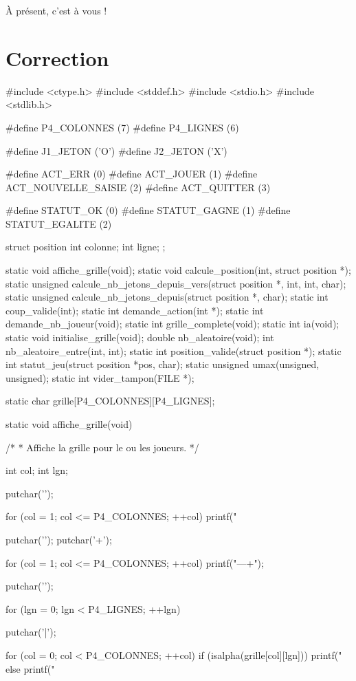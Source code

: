 À présent, c'est à vous !

\section{Correction}
\label{correction-19}

\begin{C}
#include <ctype.h>
#include <stddef.h>
#include <stdio.h>
#include <stdlib.h>

#define P4_COLONNES (7)
#define P4_LIGNES (6)

#define J1_JETON ('O')
#define J2_JETON ('X')

#define ACT_ERR (0)
#define ACT_JOUER (1)
#define ACT_NOUVELLE_SAISIE (2)
#define ACT_QUITTER (3)

#define STATUT_OK (0)
#define STATUT_GAGNE (1)
#define STATUT_EGALITE (2)

struct position
{
    int colonne;
    int ligne;
};

static void affiche_grille(void);
static void calcule_position(int, struct position *);
static unsigned calcule_nb_jetons_depuis_vers(struct position *, int, int, char);
static unsigned calcule_nb_jetons_depuis(struct position *, char);
static int coup_valide(int);
static int demande_action(int *);
static int demande_nb_joueur(void);
static int grille_complete(void);
static int ia(void);
static void initialise_grille(void);
double nb_aleatoire(void);
int nb_aleatoire_entre(int, int);
static int position_valide(struct position *);
static int statut_jeu(struct position *pos, char);
static unsigned umax(unsigned, unsigned);
static int vider_tampon(FILE *);

static char grille[P4_COLONNES][P4_LIGNES];


static void affiche_grille(void)
{
    /*
     * Affiche la grille pour le ou les joueurs.
     */

    int col;
    int lgn;

    putchar('\n');

    for (col = 1; col <= P4_COLONNES; ++col)
        printf("  %

    putchar('\n');
    putchar('+');

    for (col = 1; col <= P4_COLONNES; ++col)
        printf("---+");

    putchar('\n');

    for (lgn = 0; lgn < P4_LIGNES; ++lgn)
    {
        putchar('|');

        for (col = 0; col < P4_COLONNES; ++col)
            if (isalpha(grille[col][lgn]))
                printf(" %
            else
                printf(" %

}}
\end{C}
